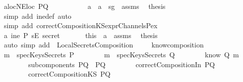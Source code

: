 \begin{isabellebody}
\ a{}{}locNE{\isacharcolon}{\isachardoublequoteopen}loc\ PQ\ {\isasymnoteq}\ {\isacharbraceleft}{\isacharbraceright}{\isachardoublequoteclose}\isanewline
\ \ \ \ \ \ \ \isamarkupfalse%
\ a{}\ \ a{}{}\ \ sg{}\ \ assms\ \isamarkupfalse%
\ {\isacharquery}thesis\isanewline
\ \ \ \ \ \ \ \ \ \isamarkupfalse%
\ {\isacharparenleft}simp\ add{\isacharcolon}\ ine{\isacharunderscore}def{\isacharcomma}\ auto{\isacharparenright}\isanewline
\ \ \ \ \ \ \ \ \ \isamarkupfalse%
\ {\isacharparenleft}simp\ add{\isacharcolon}\ correctCompositionKS{\isacharunderscore}exprChannel{\isacharunderscore}s{\isacharunderscore}Pex{\isacharparenright}\ \isanewline
\ \ \ \ \ \isamarkupfalse%
\isanewline
\ \ \ \isamarkupfalse%
\isanewline
\ \ \ \ \ \isamarkupfalse%
\ a{}{}{\isacharcolon}{\isachardoublequoteopen}{\isasymnot}\ ine\ P\ {\isacharparenleft}sE\ secret{\isacharparenright}{\isachardoublequoteclose}\isanewline
\ \ \ \ \ \isamarkupfalse%
\ this\ \ a{}\ \ assms\ \isamarkupfalse%
\ {\isacharquery}thesis\isanewline
\ \ \ \ \ \ \ \isamarkupfalse%
\ {\isacharparenleft}auto{\isacharcomma}\ simp\ add{\isacharcolon}\ \ LocalSecretsComposition{}{\isacharparenright}\isanewline
\ \ \ \isamarkupfalse%
\isanewline
{}\isamarkupfalse%
%
\endisatagproof
{\isafoldproof}%
%
\isadelimproof
\isanewline
%
\endisadelimproof
\isanewline
{}\isamarkupfalse%
\ know{\isacharunderscore}composition{}{\isacharcolon}\isanewline
{}\ {\isachardoublequoteopen}m\ {\isasymnotin}\ specKeysSecrets\ P{\isachardoublequoteclose}\isanewline
\ \ \ \ \ \ \ \ {\isachardoublequoteopen}m\ {\isasymnotin}\ specKeysSecrets\ Q{\isachardoublequoteclose}\isanewline
\ \ \ \ \ \ \ \ {\isachardoublequoteopen}know\ Q\ m{\isachardoublequoteclose}\isanewline
\ \ \ \ \ \ \ \ {\isachardoublequoteopen}subcomponents\ PQ\ {\isacharequal}\ {\isacharbraceleft}P{\isacharcomma}Q{\isacharbraceright}{\isachardoublequoteclose}\isanewline
\ \ \ \ \ \ \ \ {\isachardoublequoteopen}correctCompositionIn\ PQ{\isachardoublequoteclose}\isanewline
\ \ \ \ \ \ \ \ {\isachardoublequoteopen}correctCompositionKS\ PQ{\isachardoublequoteclose}\isanewline

\end{isabellebody}
